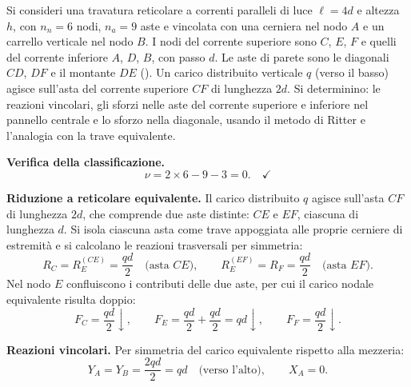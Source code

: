 \begin{esempio}
	Si consideri una travatura reticolare a correnti
	paralleli di luce $\ell = 4d$ e altezza $h$, con
	$n_n = 6$ nodi, $n_a = 9$ aste e vincolata con
	una cerniera nel nodo $A$ e un carrello verticale
	nel nodo $B$. I nodi del corrente superiore sono
	$C$, $E$, $F$ e quelli del corrente inferiore
	$A$, $D$, $B$, con passo $d$. Le aste di parete
	sono le diagonali $CD$, $DF$ e il montante $DE$
	().
	Un carico distribuito verticale $q$ (verso il
	basso) agisce sull'asta del corrente superiore
	$CF$ di lunghezza $2d$.
	Si determinino: le reazioni vincolari, gli sforzi
	nelle aste del corrente superiore e inferiore
	nel pannello centrale e lo sforzo nella diagonale,
	usando il metodo di Ritter e l'analogia con la
	trave equivalente.
	
	\begin{svolgimento}



		
		
		\noindent\textbf{Verifica della classificazione.}
		\[
		\nu = 2 \times 6 - 9 - 3 = 0. \quad\checkmark
		\]
		
		\noindent\textbf{Riduzione a reticolare equivalente.}
		Il carico distribuito $q$ agisce sull'asta $CF$ di
		lunghezza $2d$, che comprende due aste distinte:
		$CE$ e $EF$, ciascuna di lunghezza $d$.
		Si isola ciascuna asta come trave appoggiata alle
		proprie cerniere di estremità e si calcolano le
		reazioni trasversali per simmetria:
		\[
		R_C = R_E^{(CE)} = \frac{qd}{2}
		\quad \text{(asta } CE\text{)},
		\qquad
		R_E^{(EF)} = R_F = \frac{qd}{2}
		\quad \text{(asta } EF\text{)}.
		\]
		Nel nodo $E$ confluiscono i contributi delle due aste,
		per cui il carico nodale equivalente risulta doppio:
		\[
		F_C = \frac{qd}{2} \downarrow, \qquad
		F_E = \frac{qd}{2} + \frac{qd}{2} = qd \downarrow, \qquad
		F_F = \frac{qd}{2} \downarrow.
		\]
		
		\noindent\textbf{Reazioni vincolari.}
		Per simmetria del carico equivalente rispetto alla
		mezzeria:
		\[
		Y_A = Y_B = \frac{2qd}{2} = qd
		\quad\text{(verso l'alto)}, \qquad X_A = 0.
		\]
		

\end{svolgimento}
\end{esempio}

